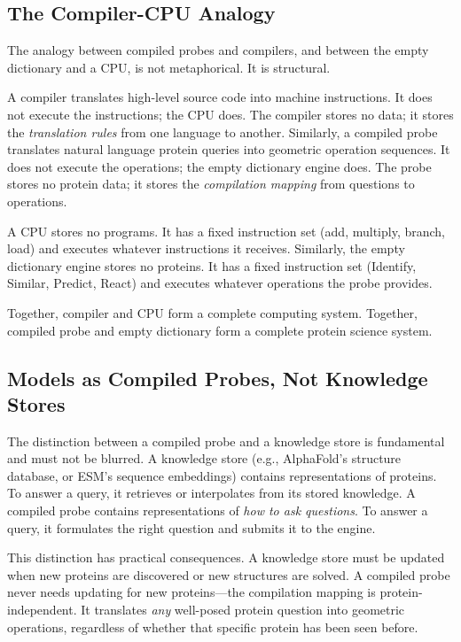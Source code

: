 \documentclass[11pt,twocolumn,a4paper]{article}
\theoremstyle{definition}
\theoremstyle{remark}
\begin{document}
\subsection{The Compiler-CPU Analogy}

The analogy between compiled probes and compilers, and between the empty dictionary and a CPU, is not metaphorical. It is structural.

A compiler translates high-level source code into machine instructions. It does not execute the instructions; the CPU does. The compiler stores no data; it stores the \emph{translation rules} from one language to another. Similarly, a compiled probe translates natural language protein queries into geometric operation sequences. It does not execute the operations; the empty dictionary engine does. The probe stores no protein data; it stores the \emph{compilation mapping} from questions to operations.

A CPU stores no programs. It has a fixed instruction set (add, multiply, branch, load) and executes whatever instructions it receives. Similarly, the empty dictionary engine stores no proteins. It has a fixed instruction set (Identify, Similar, Predict, React) and executes whatever operations the probe provides.

Together, compiler and CPU form a complete computing system. Together, compiled probe and empty dictionary form a complete protein science system.

\subsection{Models as Compiled Probes, Not Knowledge Stores}

The distinction between a compiled probe and a knowledge store is fundamental and must not be blurred. A knowledge store (e.g., AlphaFold's structure database, or ESM's sequence embeddings) contains representations of proteins. To answer a query, it retrieves or interpolates from its stored knowledge. A compiled probe contains representations of \emph{how to ask questions}. To answer a query, it formulates the right question and submits it to the engine.

This distinction has practical consequences. A knowledge store must be updated when new proteins are discovered or new structures are solved. A compiled probe never needs updating for new proteins---the compilation mapping is protein-independent. It translates \emph{any} well-posed protein question into geometric operations, regardless of whether that specific protein has been seen before.
\end{document}
